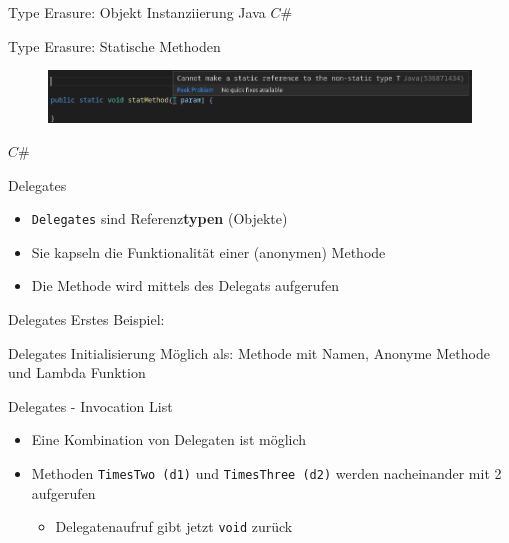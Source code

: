\documentclass[11pt]{beamer}
\begin{document}
\begin{frame}{Type Erasure: Objekt Instanziierung}
	Java
	$C\#$
\end{frame}

\begin{frame}{Type Erasure: Statische Methoden}
	\begin{figure}
		\includegraphics[width=\textwidth]{bilder/java_no_static_methods.png}
	\end{figure}
	
	$C\#$
\end{frame}


\begin{frame}{Delegates}
\begin{itemize}
 	\item \texttt{Delegates} sind Referenz\textbf{typen} (Objekte)
 	\item Sie kapseln die Funktionalität einer (anonymen) Methode
 	\item Die Methode wird mittels des Delegats aufgerufen
\end{itemize}
	
\end{frame}
\begin{frame}{Delegates}
	Erstes Beispiel:
\end{frame}

\begin{frame}{Delegates}
	Initialisierung Möglich als: Methode mit Namen, Anonyme Methode und Lambda Funktion
\end{frame}

\begin{frame}{Delegates - Invocation List}
	\begin{itemize}
		\item  Eine Kombination von Delegaten ist möglich
		\item Methoden \texttt{TimesTwo (d1)} und \texttt{TimesThree (d2)} werden nacheinander mit 2 aufgerufen
		\begin{itemize}
			\item Delegatenaufruf gibt jetzt \texttt{void} zurück
		\end{itemize}
	\end{itemize}
\end{frame}
\end{document}
